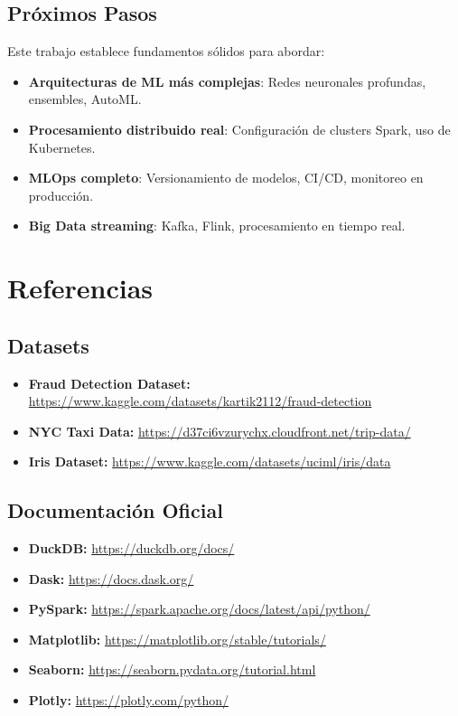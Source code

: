 \documentclass[12pt]{src/formato_utem}
\begin{document}
\subsection{Próximos Pasos}

Este trabajo establece fundamentos sólidos para abordar:
\begin{itemize}
    \item \textbf{Arquitecturas de ML más complejas}: Redes neuronales profundas, ensembles, AutoML.
    \item \textbf{Procesamiento distribuido real}: Configuración de clusters Spark, uso de Kubernetes.
    \item \textbf{MLOps completo}: Versionamiento de modelos, CI/CD, monitoreo en producción.
    \item \textbf{Big Data streaming}: Kafka, Flink, procesamiento en tiempo real.
\end{itemize}

\section*{Referencias}

\subsection*{Datasets}

\begin{itemize}
    \item \textbf{Fraud Detection Dataset:} \url{https://www.kaggle.com/datasets/kartik2112/fraud-detection}
    \item \textbf{NYC Taxi Data:} \url{https://d37ci6vzurychx.cloudfront.net/trip-data/}
    \item \textbf{Iris Dataset:} \url{https://www.kaggle.com/datasets/uciml/iris/data}
\end{itemize}

\subsection*{Documentación Oficial}

\begin{itemize}
    \item \textbf{DuckDB:} \url{https://duckdb.org/docs/}
    \item \textbf{Dask:} \url{https://docs.dask.org/}
    \item \textbf{PySpark:} \url{https://spark.apache.org/docs/latest/api/python/}
    \item \textbf{Matplotlib:} \url{https://matplotlib.org/stable/tutorials/}
    \item \textbf{Seaborn:} \url{https://seaborn.pydata.org/tutorial.html}
    \item \textbf{Plotly:} \url{https://plotly.com/python/}
\end{itemize}
\end{document}
